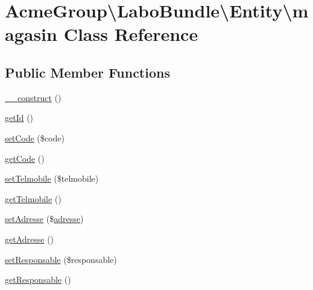 \hypertarget{class_acme_group_1_1_labo_bundle_1_1_entity_1_1magasin}{\section{Acme\+Group\textbackslash{}Labo\+Bundle\textbackslash{}Entity\textbackslash{}magasin Class Reference}
\label{class_acme_group_1_1_labo_bundle_1_1_entity_1_1magasin}
}
\subsection*{Public Member Functions}
\begin{DoxyCompactItemize}
\item 
\hyperlink{class_acme_group_1_1_labo_bundle_1_1_entity_1_1magasin_a1ca9a39f7b97540409a341216828bfb4}{\+\_\+\+\_\+construct} ()
\item 
\hyperlink{class_acme_group_1_1_labo_bundle_1_1_entity_1_1magasin_a279098e0cf73adbab2236ab22dc84921}{get\+Id} ()
\item 
\hyperlink{class_acme_group_1_1_labo_bundle_1_1_entity_1_1magasin_a092a833da98bc7d16c281852a76dbd7c}{set\+Code} (\$code)
\item 
\hyperlink{class_acme_group_1_1_labo_bundle_1_1_entity_1_1magasin_a1c987e2f790b5c0171b3e39a2c4e5ceb}{get\+Code} ()
\item 
\hyperlink{class_acme_group_1_1_labo_bundle_1_1_entity_1_1magasin_a4a3faab630270148fd1c22943ef73253}{set\+Telmobile} (\$telmobile)
\item 
\hyperlink{class_acme_group_1_1_labo_bundle_1_1_entity_1_1magasin_a676705982d049d79b3a20e1226ee3879}{get\+Telmobile} ()
\item 
\hyperlink{class_acme_group_1_1_labo_bundle_1_1_entity_1_1magasin_a379779c757b5f14fa42eac131c9b77f2}{set\+Adresse} (\$\hyperlink{class_acme_group_1_1_labo_bundle_1_1_entity_1_1adresse}{adresse})
\item 
\hyperlink{class_acme_group_1_1_labo_bundle_1_1_entity_1_1magasin_ace03a51caea890a8f3d166b1a8972803}{get\+Adresse} ()
\item 
\hyperlink{class_acme_group_1_1_labo_bundle_1_1_entity_1_1magasin_a655bc0057f82290f627a73565328eb67}{set\+Responsable} (\$responsable)
\item 
\hyperlink{class_acme_group_1_1_labo_bundle_1_1_entity_1_1magasin_a37aa3777fb60e6a079cff0df43366aef}{get\+Responsable} ()

\end{DoxyCompactItemize}
